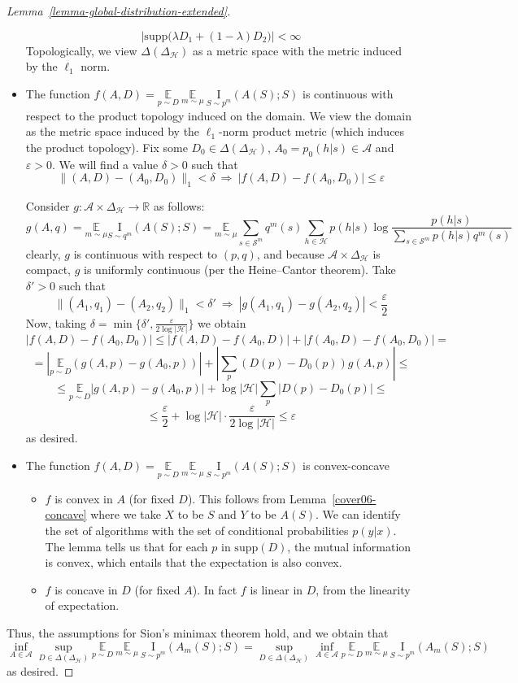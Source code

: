 \documentclass[final,12pt]{colt2018}
\newcommand{\EE}[1]{\underset{#1}{\mathbb{E}}}
\newcommand{\mc}[1]{\mathcal{#1}}
\newcommand{\cH}{\mc{H}}
\newcommand{\cA}{\mc{A}}
\newcommand{\cS}{\mc{S}}
\newcommand{\I}[2]{\underset{#1}{\mathrm{I}}\left(#2\right)}
\newcommand{\supp}{\mathrm{supp}}
\begin{document}
\begin{proof}[Lemma~\ref{lemma-global-distribution-extended}]
\begin{itemize}
{			\[
			\left|\supp\Big(\lambda D_1 + (1-\lambda) D_2 \Big)\right| < \infty
			\]
			Topologically, we view $\Delta(\Delta_{\cH})$ as a metric space with the metric induced by the $\ell_1$ norm. 
		}
		\item{
			The function $f(A, D) = \EE{p \sim D} \: \EE{m \sim \mu} \: \I{S \sim p^m}{A(S);S}$ is continuous with respect to the product topology induced on the domain. We view the domain as the metric space induced by the $\ell_1$-norm product metric (which induces the product topology). Fix some $D_0 \in \Delta(\Delta_\cH)$, $A_0=p_0(h|s)\in\cA$ and $\varepsilon > 0$. We will find a value $\delta>0$ such that
			\[
			\|(A,D)-(A_0,D_0)\|_1<\delta \: \Longrightarrow \: |f(A, D)-f(A_0, D_0)|\leq \varepsilon
			\]
			
			Consider $g: \cA \times \Delta_\cH \rightarrow \mathbb{R}$ as follows:
			\[
			g(A,q)=\EE{m \sim \mu}\I{S\sim q^m}{A(S);S}= \EE{m \sim \mu} \sum_{s \in \cS^m}q^m(s) \sum_{h \in \cH} p(h|s) \log \frac{p(h|s)}{\sum_{s \in \cS^m} p(h|s)q^m(s)}
			\]
			clearly, $g$ is continuous with respect to $(p,q)$, and because $\cA \times \Delta_\cH$ is compact, $g$ is uniformly continuous (per the Heine--Cantor theorem). Take $\delta'>0$ such that
			\[
			\|(A_1,q_1)-(A_2,q_2)\|_1<\delta' \: \Longrightarrow \: |g(A_1,q_1)-g(A_2,q_2)|<\frac{\varepsilon}{2}
			\]
			Now, taking $\delta=\min\{\delta', \frac{\varepsilon}{2\log|\cH|}\}$ we obtain
			\[
			|f(A,D)-f(A_0,D_0)| \leq |f(A,D)-f(A_0,D)|+|f(A_0,D)-f(A_0,D_0)| =
			\]
			\[
			= \left|\EE{p \sim D} \left(g(A,p)-g(A_0,p)\right)\right| + \left|\sum_{p} \left(D(p)-D_0(p)\right)g(A,p)\right| \leq
			\]
			\[
			\leq \EE{p \sim D} \left|g(A,p)-g(A_0,p)\right| + \log |\cH|\sum_{p} \left|D(p)-D_0(p)\right| \leq
			\]
			\[
			\leq \frac{\varepsilon}{2} + \log|\cH| \cdot \frac{\varepsilon}{2\log|\cH|} \leq \varepsilon
			\]
			as desired.
		}
		\item{The function $f(A, D) = \EE{p \sim D} \: \EE{m \sim \mu} \: \I{S \sim p^m}{A(S);S}$ is convex-concave
			\begin{itemize}
				\item{$f$ is convex in $A$ (for fixed $D$). This follows from Lemma~\ref{cover06-concave} where we take $X$ to be $S$ and $Y$ to be $A(S)$. We can identify the set of algorithms with the set of conditional probabilities $p(y|x)$. The lemma tells us that for each $p$ in $\supp(D)$, the mutual information is convex, which entails that the expectation is also convex.}
				\item{$f$ is concave in $D$ (for fixed $A$). In fact $f$ is linear in $D$, from the linearity of expectation.}
			\end{itemize}
		}
	\end{itemize}
	
	Thus, the assumptions for Sion's minimax theorem hold, and we obtain that
	\[
	\inf_{A\in\cA}\sup_{D\in \Delta(\Delta_{\cH})} \EE{p \sim D} \: \EE{m \sim \mu} \: \I{S \sim p^m}{A_m(S);S} = \sup_{D\in \Delta(\Delta_{\cH})}\inf_{A\in\cA} \EE{p \sim D} \: \EE{m \sim \mu} \: \I{S \sim p^m}{A_m(S);S}
	\]
	as desired.
\end{proof}
\end{document}
